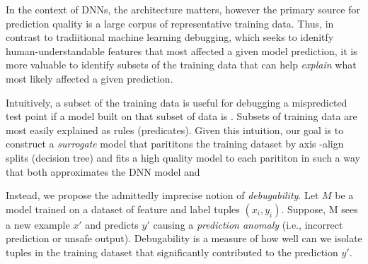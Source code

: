 In the context of DNNs, the architecture matters, however the primary source for prediction quality is a large corpus of representative training data.  
Thus, in contrast to tradiitional machine learning debugging, which seeks to idenitfy human-understandable features that most affected a given model prediction, it is more valuable to identify subsets of the training data that can help {\it explain} what most likely affected a given prediction.




Intuitively, a subset of the training data is useful for debugging a mispredicted test point if a model built on that subset of data is .  Subsets of training data are most easily explained as rules (predicates).  Given this intuition, our goal is to construct a {\it surrogate} model that parititons the training dataset by axis -align splits (decision tree) and fits a high quality model to each parititon in such a way that both approximates the DNN model and 

Instead, we propose the admittedly imprecise notion of \emph{debugability}.
Let $M$ be a model trained on a dataset of feature and label tuples $(x_i,y_i)$.
Suppose, M sees a new example $x'$ and predicts $y'$ causing a \emph{prediction anomaly} (i.e., incorrect prediction or unsafe output).
Debugability is a measure of how well can we isolate tuples in the training dataset that significantly contributed to the prediction $y'$.

